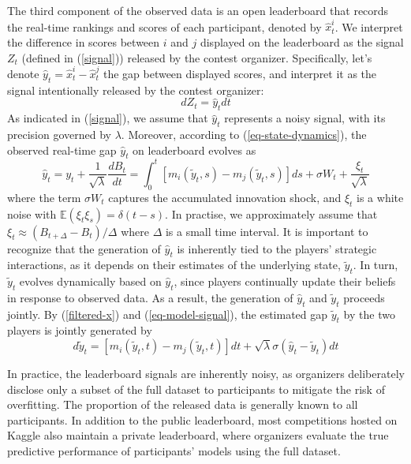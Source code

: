 \documentclass[mnsc]{informs3}
\begin{document}
The third component of the observed data is an open leaderboard that records the real-time rankings and scores of each participant, denoted by $\hat{x}^i_t$. 
We interpret the difference in scores between $i$ and $j$ displayed on the leaderboard as the signal $Z_t$ (defined in (\ref{signal})) released by the contest organizer. 
Specifically, let's denote $\hat{y}_t = \hat{x}^i_t - \hat{x}^j_t$ the gap between displayed scores, and interpret it as the signal intentionally released by the contest organizer: 
\begin{equation}\label{eq-model-signal}
dZ_t = \hat{y}_tdt
\end{equation}
As indicated in (\ref{signal}), we assume that $\hat{y}_t$ represents a noisy signal, with its precision governed by $\lambda$.
Moreover, according to (\ref{eq-state-dynamics}), the observed real-time gap $\hat{y}_t$ on leaderboard evolves as 
\begin{equation}\label{eq-leaderboard-gap}
\hat{y}_t = y_t + \frac{1}{\sqrt{\lambda}}\frac{dB_t}{dt} = \int^t_0\left[m_i(\tilde{y}_t, s) - m_j(\tilde{y}_t, s)\right]ds + \sigma W_{t} + \frac{\xi_t}{\sqrt{\lambda}}
\end{equation}
where the term $\sigma W_t$ captures the accumulated innovation shock, and $\xi_t$ is a white noise with $\mathbb{E}(\xi_t\xi_s) = \delta(t-s)$. 
In practise, we approximately assume that $\xi_t \approx (B_{t+\Delta} - B_t)/\Delta$ where $\Delta$ is a small time interval. 
It is important to recognize that the generation of $\hat{y}_t$ is inherently tied to the players’ strategic interactions, as it depends on their estimates of the underlying state, $\tilde{y}_t$. 
In turn, $\tilde{y}_t$ evolves dynamically based on $\hat{y}_t$, since players continually update their beliefs in response to observed data. 
As a result, the generation of $\hat{y}_t$ and $\tilde{y}_t$ proceeds jointly.
By (\ref{filtered-x}) and (\ref{eq-model-signal}), the estimated gap $\tilde{y}_t$ by the two players is jointly generated by 
\begin{equation}\label{eq-fintered-y-update}
d\tilde{y}_{t} = \left[m_i(\tilde{y}_t, t) - m_j(\tilde{y}_t, t)\right]dt + \sqrt{\lambda}\sigma(\hat{y}_t-\tilde{y}_{t}) dt
\end{equation}

In practice, the leaderboard signals are inherently noisy, as organizers deliberately disclose only a subset of the full dataset to participants to mitigate the risk of overfitting. 
The proportion of the released data is generally known to all participants.
In addition to the public leaderboard, most competitions hosted on Kaggle also maintain a private leaderboard, where organizers evaluate the true predictive performance of participants’ models using the full dataset.
\end{document}
